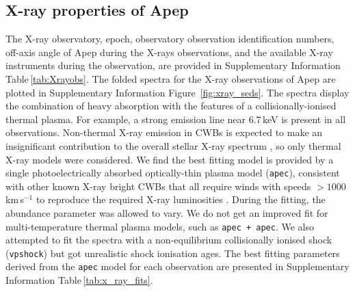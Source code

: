 \documentclass[preprint,times]{aastex61}
\begin{document}
\subsection{X-ray properties of Apep}
\label{sec:xrays}

The X-ray observatory, epoch, observatory observation identification numbers, off-axis angle of Apep during the X-rays observations, and the available X-ray instruments during the observation, are provided in Supplementary Information Table\,\ref{tab:Xrayobs}. The folded spectra for the X-ray observations of Apep are plotted in Supplementary Information Figure~\ref{fig:xray_seds}. The spectra display the combination of heavy absorption with the features of a collisionally-ionised thermal plasma. For example, a strong emission line near 6.7\,keV is present in all observations. Non-thermal X-ray emission in CWBs is expected to make an insignificant contribution to the overall stellar X-ray spectrum \cite{2010MNRAS.403.1657P}, so only thermal X-ray models were considered. We find the best fitting model is provided by a single photoelectrically absorbed optically-thin plasma model ({\tt apec}), consistent with other known X-ray bright CWBs that all require winds with speeds $> 1000$\,km\,s$^{-1}$ to reproduce the required X-ray luminosities \citep{Anderson2011}. During the fitting, the abundance parameter was allowed to vary. We do not get an improved fit for multi-temperature thermal plasma models, such as {\tt apec + apec}. We also attempted to fit the spectra with a non-equilibrium collisionally ionised shock ({\tt vpshock}) but got unrealistic shock ionisation ages. The best fitting parameters derived from the {\tt apec} model for each observation are presented in Supplementary Information Table\,\ref{tab:x_ray_fits}. 
\end{document}
